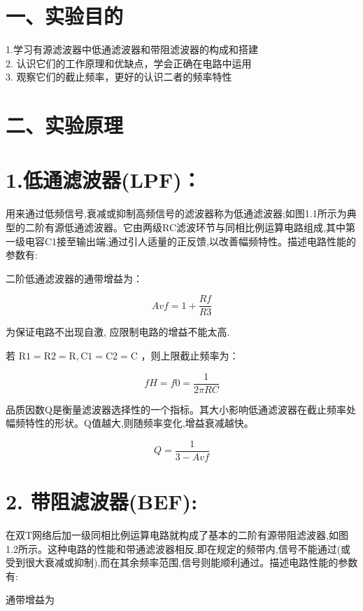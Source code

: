 \documentclass[
  10
]{article}
\begin{document}
\section{一、实验目的}\label{ux4e00ux5b9eux9a8cux76eeux7684-4}

1.学习有源滤波器中低通滤波器和带阻滤波器的构成和搭建\\
2. 认识它们的工作原理和优缺点，学会正确在电路中运用\\
3. 观察它们的截止频率，更好的认识二者的频率特性

\section{二、实验原理}\label{ux4e8cux5b9eux9a8cux539fux7406-4}

\section{1.低通滤波器(LPF)：}\label{ux4f4eux901aux6ee4ux6ce2ux5668lpf}

用来通过低频信号,衰减或抑制高频信号的滤波器称为低通滤波器;如图1.1所示为典型的二阶有源低通滤波器。它由两级RC滤波环节与同相比例运算电路组成,其中第一级电容C1接至输出端,通过引人适量的正反馈,以改善幅频特性。描述电路性能的参数有:

二阶低通滤波器的通带增益为：

\[
A v f = 1 + \frac {R f}{R 3}
\]

为保证电路不出现自激, 应限制电路的增益不能太高.

若
\(\mathrm{R1} = \mathrm{R2} = \mathrm{R},\mathrm{C1} = \mathrm{C2} = \mathrm{C}\)
，则上限截止频率为：

\[
f H = f 0 = \frac {1}{2 \pi R C}
\]

品质因数Q是衡量滤波器选择性的一个指标。其大小影响低通滤波器在截止频率处幅频特性的形状。Q值越大,则随频率变化,增益衰减越快。

\[
Q = \frac {1}{3 - A v f}
\]

\section{2. 带阻滤波器(BEF):}\label{ux5e26ux963bux6ee4ux6ce2ux5668bef}

在双T网络后加一级同相比例运算电路就构成了基本的二阶有源带阻滤波器,如图1.2所示。这种电路的性能和带通滤波器相反,即在规定的频带内,信号不能通过(或受到很大衰减或抑制),而在其余频率范围,信号则能顺利通过。描述电路性能的参数有:

通带增益为
\end{document}
